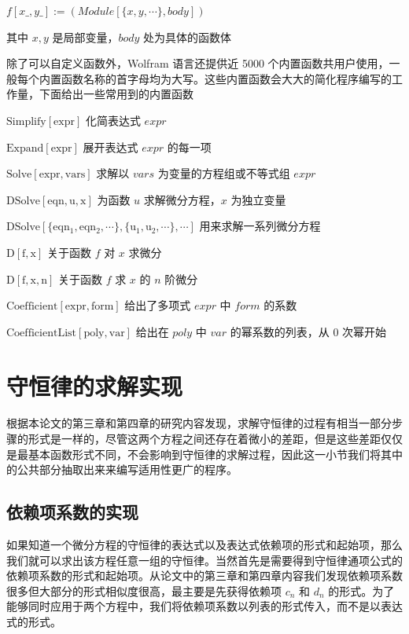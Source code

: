 $f[x\_ , y\_ ]:= (Module[\{x, y, \cdots\}, body])$

其中 $x, y$ 是局部变量，$body$ 处为具体的函数体

除了可以自定义函数外，Wolfram 语言还提供近 5000 个内置函数共用户使用，一般每个内置函数名称的首字母均为大写。这些内置函数会大大的简化程序编写的工作量，下面给出一些常用到的内置函数

$\mathrm{Simplify[expr]}$  \quad   化简表达式 $expr$

$\mathrm{Expand[expr]}$ \quad    展开表达式 $expr$ 的每一项

$\mathrm{Solve[expr, vars]}$  \quad 求解以 $vars$ 为变量的方程组或不等式组 $expr$

$\mathrm{DSolve[eqn, u, x]}$ \quad  为函数 $u$ 求解微分方程，$x$ 为独立变量

$\mathrm{DSolve[\{eqn_1, eqn_2, \cdots \}, \{u_1, u_2, \cdots \}, \cdots ]}$ \quad  用来求解一系列微分方程

$\mathrm{D[f,x]}$     \quad  关于函数 $f$ 对 $x$ 求微分

$\mathrm{D[f,{x,n}]}$     \quad     关于函数 $f$ 求 $x$ 的 $n$ 阶微分

$\mathrm{Coefficient[expr, form]}$   \quad  给出了多项式 $expr$ 中 $form$ 的系数

$\mathrm{CoefficientList[poly, var]}$   \quad  给出在 $poly$ 中 $var$ 的幂系数的列表，从 0 次幂开始

\section{守恒律的求解实现}
根据本论文的第三章和第四章的研究内容发现，求解守恒律的过程有相当一部分步骤的形式是一样的，尽管这两个方程之间还存在着微小的差距，但是这些差距仅仅是最基本函数形式不同，不会影响到守恒律的求解过程，因此这一小节我们将其中的公共部分抽取出来来编写适用性更广的程序。
\subsection{依赖项系数的实现}
如果知道一个微分方程的守恒律的表达式以及表达式依赖项的形式和起始项，那么我们就可以求出该方程任意一组的守恒律。当然首先是需要得到守恒律通项公式的依赖项系数的形式和起始项。从论文中的第三章和第四章内容我们发现依赖项系数很多但大部分的形式相似度很高，最主要是先获得依赖项 $c_n$ 和 $d_n$ 的形式。为了能够同时应用于两个方程中，我们将依赖项系数以列表的形式传入，而不是以表达式的形式。

